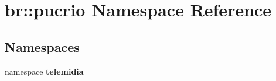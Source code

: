 \section{br::pucrio Namespace Reference}
\label{namespacebr_1_1pucrio}


\subsection*{Namespaces}
\begin{CompactItemize}
\item 
namespace {\bf telemidia}
\end{CompactItemize}
